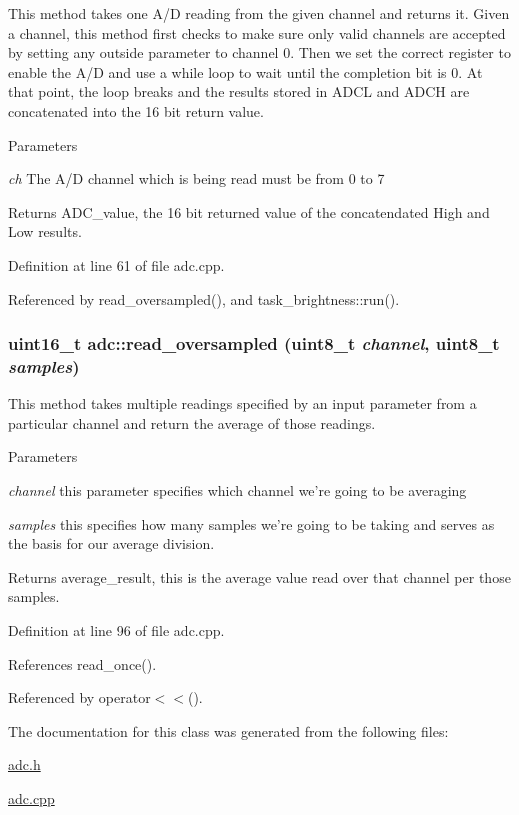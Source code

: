 This method takes one A/D reading from the given channel and returns it. Given a channel, this method first checks to make sure only valid channels are accepted by setting any outside parameter to channel 0. Then we set the correct register to enable the A/D and use a while loop to wait until the completion bit is 0. At that point, the loop breaks and the results stored in ADCL and ADCH are concatenated into the 16 bit return value. 
\begin{DoxyParams}{Parameters}
\item[{\em ch}]The A/D channel which is being read must be from 0 to 7 \end{DoxyParams}
\begin{DoxyReturn}{Returns}
ADC\_\-value, the 16 bit returned value of the concatendated High and Low results. 
\end{DoxyReturn}


Definition at line 61 of file adc.cpp.

Referenced by read\_\-oversampled(), and task\_\-brightness::run().\hypertarget{classadc_a58f1030fe64d3dea4ccd8a2687dd6fce}{
\subsubsection[{read\_\-oversampled}]{\setlength{\rightskip}{0pt plus 5cm}uint16\_\-t adc::read\_\-oversampled (uint8\_\-t {\em channel}, \/  uint8\_\-t {\em samples})}}
\label{classadc_a58f1030fe64d3dea4ccd8a2687dd6fce}


This method takes multiple readings specified by an input parameter from a particular channel and return the average of those readings. 
\begin{DoxyParams}{Parameters}
\item[{\em channel}]this parameter specifies which channel we're going to be averaging \item[{\em samples}]this specifies how many samples we're going to be taking and serves as the basis for our average division. \end{DoxyParams}
\begin{DoxyReturn}{Returns}
average\_\-result, this is the average value read over that channel per those samples. 
\end{DoxyReturn}


Definition at line 96 of file adc.cpp.

References read\_\-once().

Referenced by operator$<$$<$().

The documentation for this class was generated from the following files:\begin{DoxyCompactItemize}
\item 
\hyperlink{adc_8h}{adc.h}\item 
\hyperlink{adc_8cpp}{adc.cpp}\end{DoxyCompactItemize}
